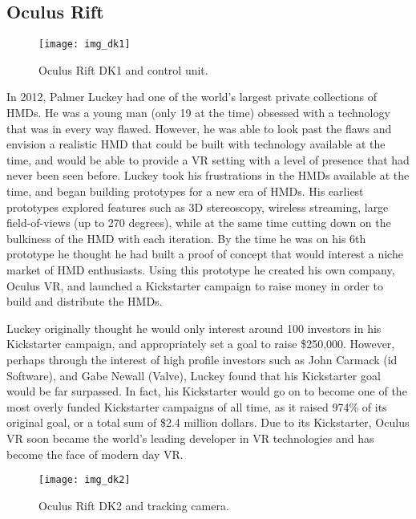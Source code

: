 \subsection{Oculus Rift}
\label{sec:oculuisvr}

\begin{figure}
  \centering
  \texttt{[image: img\_dk1]}
  \caption{Oculus Rift DK1 and control unit.}
  \label{figure:f_dk1}
\end{figure}

In 2012, Palmer Luckey had one of the world's largest private collections of HMDs. He was a young man (only 19 at the time) obsessed with a technology that was in every way flawed. However, he was able to look past the flaws and envision a realistic HMD that could be built with technology available at the time, and would be able to provide a VR setting with a level of presence that had never been seen before. Luckey took his frustrations in the HMDs available at the time, and began building prototypes for a new era of HMDs. His earliest prototypes explored features such as 3D stereoscopy, wireless streaming, large field-of-views (up to 270 degrees), while at the same time cutting down on the bulkiness of the HMD with each iteration. By the time he was on his 6th prototype he thought he had built a proof of concept that would interest a niche market of HMD enthusiasts. Using this prototype he created his own company, Oculus VR, and launched a Kickstarter campaign to raise money in order to build and distribute the HMDs.

Luckey originally thought he would only interest around 100 investors in his Kickstarter campaign, and appropriately set a goal to raise \$250,000. However, perhaps through the interest of high profile investors such as John Carmack (id Software), and Gabe Newall (Valve), Luckey found that his Kickstarter goal would be far surpassed. In fact, his Kickstarter would go on to become one of the most overly funded Kickstarter campaigns of all time, as it raised 974\% of its original goal, or a total sum of \$2.4 million dollars. Due to its Kickstarter, Oculus VR soon became the world's leading developer in VR technologies and has become the face of modern day VR. 

\begin{figure}
  \centering
  \texttt{[image: img\_dk2]}
  \caption{Oculus Rift DK2 and tracking camera.}
  \label{figure:f_dk2}
\end{figure}

